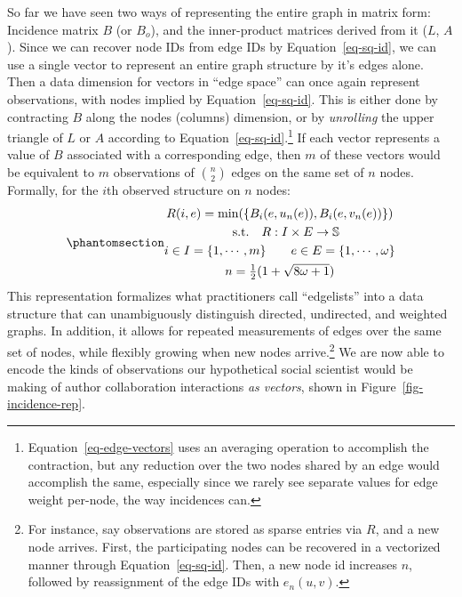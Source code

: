 \documentclass[%
	12pt,
		oneside,
		letterpaper
]{book}
\begin{document}
So far we have seen two ways of representing the entire graph in matrix form: Incidence matrix \(B\) (or \(B_o\)), and the inner-product matrices derived from it (\(L\), \(A\)).
Since we can recover node IDs from edge IDs by Equation~\ref{eq-sq-id}, we can use a single vector to represent an entire graph structure by it's edges alone.
Then a data dimension for vectors in ``edge space'' can once again represent observations, with nodes implied by Equation~\ref{eq-sq-id}.
This is either done by contracting \(B\) along the nodes (columns) dimension, or by \emph{unrolling} the upper triangle of \(L\) or \(A\) according to Equation~\ref{eq-sq-id}.\footnote{
  Equation~\ref{eq-edge-vectors} uses an averaging operation to accomplish the contraction, but any reduction over the two nodes shared by an edge would accomplish the same, especially since we rarely see separate values for edge weight per-node, the way incidences can.}
If each vector represents a value of \(B\) associated with a corresponding edge, then \(m\) of these vectors would be equivalent to \(m\) observations of \({n \choose 2}\) edges on the same set of \(n\) nodes.
Formally, for the \(i\)th observed structure on \(n\) nodes:
\begin{equation}\phantomsection\label{eq-edge-vectors}{
\begin{gathered}
R(i,e) = \min(\{B_i(e, u_n(e)),B_i(e,v_n(e))\}) \\
\quad \textrm{s.t.} \quad R:I\times E \rightarrow \mathbb{S}\\
i\in I = \{1,\cdots,m\} \qquad e \in E=\left\{1,\cdots,\omega\right\}\\
n=\tfrac{1}{2}(1+\sqrt{8\omega+1})
\end{gathered}
}\end{equation}
This representation formalizes what practitioners call ``edgelists'' into a data structure that can unambiguously distinguish directed, undirected, and weighted graphs.
In addition, it allows for repeated measurements of edges over the same set of nodes, while flexibly growing when new nodes arrive.\footnote{
  For instance, say observations are stored as sparse entries via \(R\), and a new node arrives.
  First, the participating nodes can be recovered in a vectorized manner through Equation~\ref{eq-sq-id}.
  Then, a new node id increases \(n\), followed by reassignment of the edge IDs with \(e_n(u,v)\).}
We are now able to encode the kinds of observations our hypothetical social scientist would be making of author collaboration interactions \emph{as vectors}, shown in Figure~\ref{fig-incidence-rep}.
\end{document}
